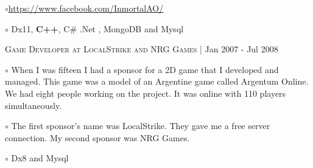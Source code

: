 \documentclass[letterpaper]{article}
\renewenvironment{itemize}{
  \begin{list}{}{
    \setlength{\leftmargin}{1.5em}
  }
}{
  \end{list}
}
\newenvironment{no-indent-itemize}{
  \begin{list}{}{
    \setlength{\leftmargin}{0em}
  }
}{
  \end{list}
}
\def\bullet{$\circ$\xspace}
\begin{document}
\begin{no-indent-itemize}
\begin{itemize}
    \item\bullet \href{https://www.facebook.com/InmortalAO/}{https://www.facebook.com/InmortalAO/}
    \item\bullet Dx11, \textbf{C++}, C\# .Net , MongoDB and Mysql
    \end{itemize}
    
    
    \item \textsc{Game Developer at LocalStrike and NRG Games} | Jan 2007 - Jul 2008
    \begin{itemize} 
    
    \item\bullet
    When I was fifteen I had a sponsor for a 2D game that I developed and managed. This game was a model of an Argentine game called Argentum Online. We had eight people working on the project. It was online with 110 players simultaneously.
    \item\bullet The first sponsor's name was LocalStrike. They gave me a free server connection. My second sponsor was NRG Games.
    \item\bullet Dx8 and Mysql
    \end{itemize}


\end{no-indent-itemize}
\end{document}
